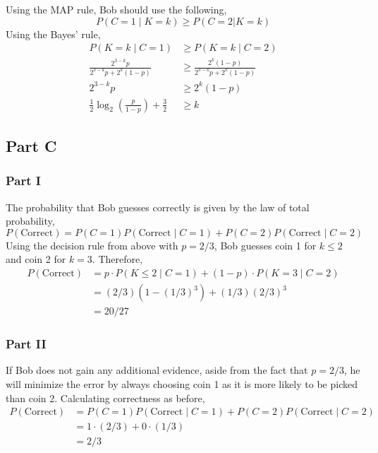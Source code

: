 \documentclass{article}
\begin{document}
Using the MAP rule, Bob should use the following,
$$ P(C = 1 \mid K = k) \geq P(C = 2 | K = k) $$
Using the Bayes' rule,
\begin{align*}
  P(K = k \mid C = 1) &\geq P(K = k \mid C = 2) \\
  \frac{2^{3 - k} p }{2^{3 - k} p + 2^k(1 - p)} &\geq \frac{2^{k} (1 - p)
  }{2^{3 - k} p + 2^k(1 - p)} \\
  2^{3 - k} p &\geq 2^{k} (1 - p) \\
  \frac{1}{2} \log_2\left(\frac{p}{1 - p}\right) + \frac{3}{2} &\geq k
\end{align*}

\subsection*{Part C}

\subsubsection*{Part I}

The probability that Bob guesses correctly is given by the law of total
probability,
$$ P(\mathrm{Correct}) = P(C = 1) P(\mathrm{Correct} \mid C = 1) + P(C = 2)
P(\mathrm{Correct} \mid C = 2) $$
Using the decision rule from above with $p = 2/3$, Bob guesses coin 1 for $k
\leq 2$ and coin 2 for $k = 3$. Therefore,
\begin{align*}
  P(\mathrm{Correct}) &= p \cdot P(K \leq 2 \mid C = 1) + (1 - p) \cdot P(K =
  3 \mid C = 2) \\
  &= (2/3) (1 - (1/3)^3) + (1/3) (2/3)^3 \\
  &= 20 / 27
\end{align*}

\subsubsection*{Part II}

If Bob does not gain any additional evidence, aside from the fact that $p =
2/3$, he will minimize the error by always choosing coin 1 as it is more
likely to be picked than coin 2. Calculating correctness as before,
\begin{align*}
  P(\mathrm{Correct}) &= P(C = 1) P(\mathrm{Correct} \mid C = 1) + P(C = 2)
  P(\mathrm{Correct} \mid C = 2) \\
  &= 1 \cdot (2/3) + 0 \cdot (1/3) \\
  &= 2/3
\end{align*}
\end{document}

